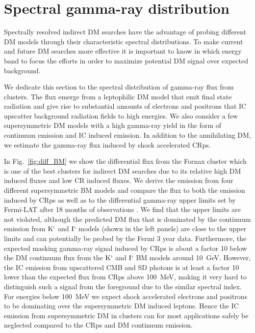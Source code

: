 \documentclass[10pt,aps,pra,reprint,amsmath,amsfonts,amssymb,showpacs]{revtex4-1}
\newcommand{\rmn}{\mathrm}
\newcommand{\Kp}{\rmn{K}`}
\newcommand{\Ip}{\rmn{I}`}
\begin{document}
\section{Spectral gamma-ray distribution}
\label{sect:spectral}
Spectrally resolved indirect DM searches have the advantage of probing
different DM models through their characteristic spectral
distributions. To make current and future DM searches more effective
it is important to know in which energy band to focus the efforts in
order to maximize potential DM signal over expected background.

We dedicate this section to the spectral distribution of gamma-ray
flux from clusters. The flux emerge from a leptophilic DM model that
emit final state radiation and give rise to substantial amounts of
electrons and positrons that IC upscatter background radiation fields
to high energies. We also consider a few supersymmetric DM models with
a high gamma-ray yield in the form of continuum emission and IC
induced emission. In addition to the annihilating DM, we estimate the
gamma-ray flux induced by shock accelerated CRps.

In Fig.~\ref{fig:diff_BM} we show the differential flux from the
Fornax cluster which is one of the best clusters for indirect DM
searches due to its relative high DM induced fluxes and low CR induced
fluxes. We derive the emission from four different supersymmetric BM
models and compare the flux to both the emission induced by CRps as
well as to the differential gamma-ray upper limits set by Fermi-LAT
after 18 months of observations \cite{2010ApJ...717L..71A}. We find
that the upper limits are not violated, although the predicted DM flux
that is dominated by the continuum emission from $\Kp$ and $\Ip$
models (shown in the left panels) are close to the upper limits and
can potentially be probed by the Fermi 3 year data. Furthermore, the
expected masking gamma-ray signal induced by CRps is about a factor 10
below the DM continuum flux from the $\Kp$ and $\Ip$ BM models around
10~GeV. However, the IC emission from upscattered CMB and SD photons
is at least a factor 10 lower than the expected flux from CRps above
100~MeV, making it very hard to distinguish such a signal from the
foreground due to the similar spectral index. For energies below
100~MeV we expect shock accelerated electrons and positrons to be
dominating \cite{2010MNRAS.409..449P} over the supersymmetric DM
induced leptons. Hence the IC emission from supersymmetric DM in
clusters can for most applications safely be neglected compared to the
CRps and DM continuum emission.
\end{document}
